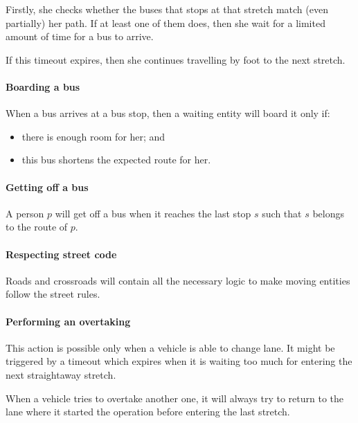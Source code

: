 Firstly, she checks whether the buses that stops at that stretch match (even
partially) her path. If at least one of them does, then she wait for a limited
amount of time for a bus to arrive.

If this timeout expires, then she continues travelling by foot to the next
stretch.

\paragraph{Boarding a bus} When a bus arrives at a bus stop, then a waiting
entity will board it only if:

\begin{itemize}
  \item there is enough room for her; and
  \item this bus shortens the expected route for her.
\end{itemize}

\paragraph{Getting off a bus} A person $p$ will get off a bus when it reaches
the last stop $s$ such that $s$ belongs to the route of $p$.

\paragraph{Respecting street code} Roads and crossroads will contain all the
necessary logic to make moving entities follow the street rules.

\paragraph{Performing an overtaking} This action is possible only when a
vehicle is able to change lane. It might be triggered by a timeout which
expires when it is waiting too much for entering the next straightaway stretch.

When a vehicle tries to overtake another one, it will always try to return to
the lane where it started the operation before entering the last stretch.


